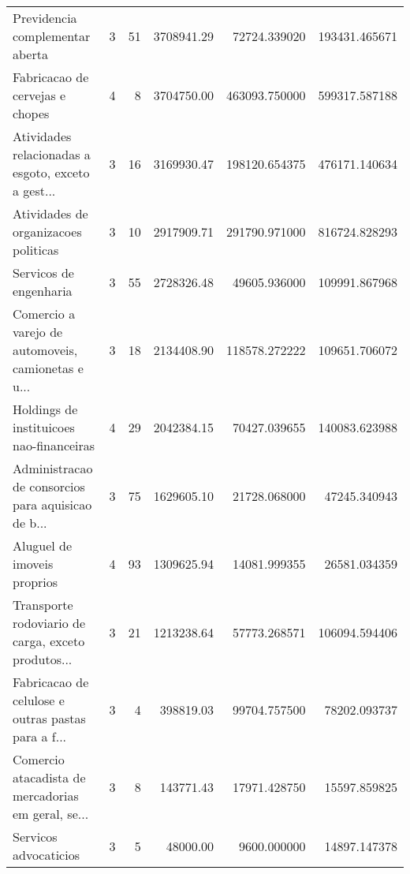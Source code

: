 \begin{tabular}{lrrrrr}
                   Previdencia complementar aberta &                     3 &                   51 &   3708941.29 &  72724.339020 &             193431.465671 \\
                   Fabricacao de cervejas e chopes &                     4 &                    8 &   3704750.00 & 463093.750000 &             599317.587188 \\
Atividades relacionadas a esgoto, exceto a gest... &                     3 &                   16 &   3169930.47 & 198120.654375 &             476171.140634 \\
              Atividades de organizacoes politicas &                     3 &                   10 &   2917909.71 & 291790.971000 &             816724.828293 \\
                            Servicos de engenharia &                     3 &                   55 &   2728326.48 &  49605.936000 &             109991.867968 \\
Comercio a varejo de automoveis, camionetas e u... &                     3 &                   18 &   2134408.90 & 118578.272222 &             109651.706072 \\
          Holdings de instituicoes nao-financeiras &                     4 &                   29 &   2042384.15 &  70427.039655 &             140083.623988 \\
Administracao de consorcios para aquisicao de b... &                     3 &                   75 &   1629605.10 &  21728.068000 &              47245.340943 \\
                       Aluguel de imoveis proprios &                     4 &                   93 &   1309625.94 &  14081.999355 &              26581.034359 \\
Transporte rodoviario de carga, exceto produtos... &                     3 &                   21 &   1213238.64 &  57773.268571 &             106094.594406 \\
Fabricacao de celulose e outras pastas para a f... &                     3 &                    4 &    398819.03 &  99704.757500 &              78202.093737 \\
Comercio atacadista de mercadorias em geral, se... &                     3 &                    8 &    143771.43 &  17971.428750 &              15597.859825 \\
                             Servicos advocaticios &                     3 &                    5 &     48000.00 &   9600.000000 &              14897.147378 \\
\bottomrule
\end{tabular}
